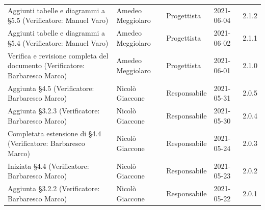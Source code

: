 \documentclass[a4paper]{article}
\begin{document}
\begin{center}
\begin{table}[h!]
\begin{tabular}{p{160px} p{90px} p{70px} p{55px} p{45px}}
            Aggiunti tabelle e diagrammi a \S 5.5 \newline(Verificatore: Manuel Varo)                               & Amedeo Meggiolaro & Progettista    & 2021-06-04    & 2.1.2             \\
            Aggiunti tabelle e diagrammi a \S 5.4 \newline(Verificatore: Manuel Varo)                               & Amedeo Meggiolaro & Progettista    & 2021-06-02    & 2.1.1             \\
            Verifica e revisione completa del documento \newline(Verificatore: Barbaresco Marco)                    & Amedeo Meggiolaro & Progettista    & 2021-06-01    & 2.1.0             \\
            Aggiunta \S 4.5 \newline(Verificatore: Barbaresco Marco)                                                & Nicolò Giaccone   & Responsabile   & 2021-05-31    & 2.0.5             \\
            Aggiunta \S 3.2.3 \newline(Verificatore: Barbaresco Marco)                                              & Nicolò Giaccone   & Responsabile   & 2021-05-30    & 2.0.4             \\
            Completata estensione di \S 4.4   \newline(Verificatore: Barbaresco Marco)                              & Nicolò Giaccone   & Responsabile   & 2021-05-24    & 2.0.3             \\
            Iniziata \S 4.4   \newline(Verificatore: Barbaresco Marco)                                              & Nicolò Giaccone   & Responsabile   & 2021-05-23    & 2.0.2             \\
            Aggiunta \S 3.2.2 \newline(Verificatore: Barbaresco Marco)                                              & Nicolò Giaccone   & Responsabile   & 2021-05-22    & 2.0.1             \\
            
        \end{tabular}
    \end{table}


\end{center}
\end{document}
